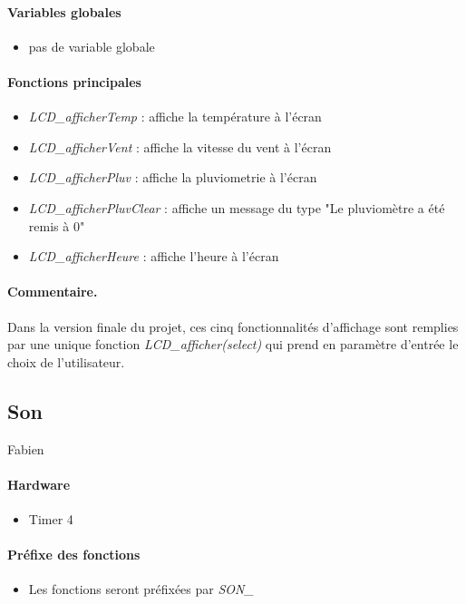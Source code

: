 \documentclass[a4paper]{report}
\begin{document}
\paragraph{Variables globales}
\begin{itemize}
\item pas de variable globale
\end{itemize}
\paragraph{Fonctions principales}
\begin{itemize}
\item \emph{LCD\_afficherTemp} : affiche la température à l’écran
\item \emph{LCD\_afficherVent} : affiche la vitesse du vent à l’écran
\item \emph{LCD\_afficherPluv} : affiche la pluviometrie à l’écran
\item \emph{LCD\_afficherPluvClear} : affiche un message du type "Le pluviomètre a été remis à 0"
\item \emph{LCD\_afficherHeure} : affiche l’heure à l’écran
\end{itemize}
\paragraph{Commentaire.}
Dans la version finale du projet, ces cinq fonctionnalités d'affichage sont remplies par une unique fonction \emph{LCD\_afficher(select)} qui prend en paramètre d'entrée le choix de l'utilisateur.

\subsection{Son}
Fabien 
\paragraph{Hardware}
\begin{itemize}
\item Timer 4
\end{itemize}
\paragraph{Préfixe des fonctions}
\begin{itemize}
\item Les fonctions seront préfixées par \emph{SON\_}
\end{itemize}
\end{document}
